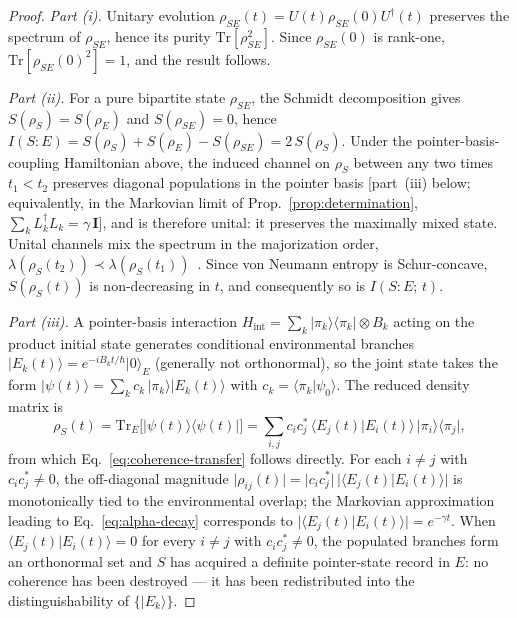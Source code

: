 \begin{proof}
\emph{Part (i).}
Unitary evolution $\rho_{SE}(t) = U(t)\rho_{SE}(0)U^\dagger(t)$
preserves the spectrum of $\rho_{SE}$, hence its purity
$\mathrm{Tr}[\rho_{SE}^2]$.
Since $\rho_{SE}(0)$ is rank-one, $\mathrm{Tr}[\rho_{SE}(0)^2] = 1$,
and the result follows.

\emph{Part (ii).}
For a pure bipartite state $\rho_{SE}$, the Schmidt decomposition
gives $S(\rho_S) = S(\rho_E)$ and $S(\rho_{SE}) = 0$, hence
$I(S\!:\!E) = S(\rho_S) + S(\rho_E) - S(\rho_{SE}) = 2\,S(\rho_S)$.
Under the pointer-basis-coupling Hamiltonian above, the induced channel
on $\rho_S$ between any two times $t_1 < t_2$ preserves diagonal
populations in the pointer basis [part~(iii) below; equivalently, in
the Markovian limit of Prop.~\ref{prop:determination},
$\sum_k L_k^\dagger L_k = \gamma\,\mathbf{I}$], and is therefore
unital: it preserves the maximally mixed state.
Unital channels mix the spectrum in the majorization order,
$\lambda(\rho_S(t_2)) \prec \lambda(\rho_S(t_1))$~\cite{NielsenChuang2000}.
Since von Neumann entropy is Schur-concave, $S(\rho_S(t))$ is
non-decreasing in $t$, and consequently so is $I(S\!:\!E;\,t)$.

\emph{Part (iii).}
A pointer-basis interaction
$H_{\mathrm{int}} = \sum_k\vert\pi_k\rangle\langle\pi_k\vert\otimes B_k$
acting on the product initial state generates conditional environmental
branches $\vert E_k(t)\rangle = e^{-iB_k t/\hbar}\vert 0\rangle_E$
(generally not orthonormal), so the joint state takes the form
$\vert\psi(t)\rangle = \sum_k c_k\,\vert\pi_k\rangle\vert E_k(t)\rangle$
with $c_k = \langle\pi_k\vert\psi_0\rangle$.
The reduced density matrix is
\begin{equation*}
  \rho_S(t) = \mathrm{Tr}_E\!\bigl[\vert\psi(t)\rangle\langle\psi(t)\vert\bigr]
  = \sum_{i,j} c_i c_j^*\,\langle E_j(t)\vert E_i(t)\rangle\,
    \vert\pi_i\rangle\langle\pi_j\vert,
\end{equation*}
from which Eq.~\eqref{eq:coherence-transfer} follows directly.
For each $i\neq j$ with $c_i c_j^* \neq 0$, the off-diagonal magnitude
$\lvert\rho_{ij}(t)\rvert = \lvert c_i c_j^*\rvert\,
\lvert\langle E_j(t)\vert E_i(t)\rangle\rvert$ is monotonically tied to
the environmental overlap; the Markovian approximation leading to
Eq.~\eqref{eq:alpha-decay} corresponds to
$\lvert\langle E_j(t)\vert E_i(t)\rangle\rvert = e^{-\gamma t}$.
When $\langle E_j(t)\vert E_i(t)\rangle = 0$ for every $i\neq j$ with
$c_i c_j^* \neq 0$, the populated branches form an orthonormal set and
$S$ has acquired a definite pointer-state record in $E$: no coherence
has been destroyed --- it has been redistributed into the
distinguishability of $\{\vert E_k\rangle\}$.
\end{proof}

